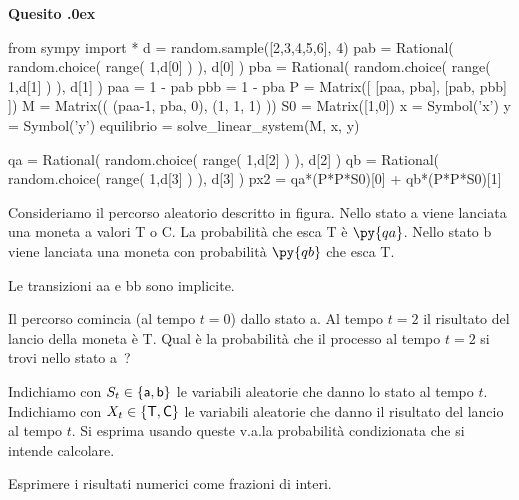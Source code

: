 \documentclass[11pt,twoside,a4paper]{article}
\newcounter{quesito}
\newenvironment{question}{\bigskip\addtocounter{quesito}{1}\bigskip\bigskip\par\textbf{Quesito \thequesito.\kern0ex}}{\par\vspace{\parskip}}
\begin{document}
\begin{question}%
\def\Pr{{\rm Pr\,}}
\def\pyl#1{\py{latex(#1)}}
\everymath{\displaystyle}
\renewcommand{\arraystretch}{2}
\begin{pycode}
from sympy import *
d = random.sample([2,3,4,5,6], 4)
pab = Rational( random.choice( range( 1,d[0] ) ), d[0] ) 
pba = Rational( random.choice( range( 1,d[1] ) ), d[1] ) 
paa = 1 - pab
pbb = 1 - pba
P  = Matrix([ [paa, pba], 
              [pab, pbb] ])
M  = Matrix(( (paa-1, pba, 0),
             (1,     1,   1) ))
S0 = Matrix([1,0])
x = Symbol('x')
y = Symbol('y')
equilibrio = solve_linear_system(M, x, y)



qa = Rational( random.choice( range( 1,d[2] ) ), d[2] ) 
qb = Rational( random.choice( range( 1,d[3] ) ), d[3] ) 
px2 = qa*(P*P*S0)[0] + qb*(P*P*S0)[1] 
\end{pycode}
Consideriamo il percorso aleatorio descritto in figura. Nello stato {\sf a} viene lanciata una moneta a valori {\sf T} o {\sf C}. La probabilità che esca {\sf T} è $\py{qa}$. Nello stato {\sf b} viene lanciata una moneta con probabilità $\py{qb}$ che esca {\sf T}.

\hfil
{}
\hfil Le transizioni {\sf aa} e {\sf bb} sono implicite.

Il percorso comincia (al tempo $t{=}0$) dallo stato {\sf a}. Al tempo $t=2$ il risultato del lancio della moneta è {\sf T}. Qual è la probabilità che il processo al tempo $t{=}2$ si trovi nello stato {\sf a}~?


Indichiamo con $S_t\in\{{\sf a}, {\sf b}\}$ le variabili aleatorie che danno lo stato al tempo $t$. Indichiamo con $X_t\in\{{\sf T}, {\sf C}\}$ le variabili aleatorie che danno il risultato del lancio al tempo $t$. Si esprima usando queste v.a.\@ la probabilità condizionata che si intende calcolare. 

Esprimere i risultati numerici come frazioni di interi.



\end{question}
\end{document}
